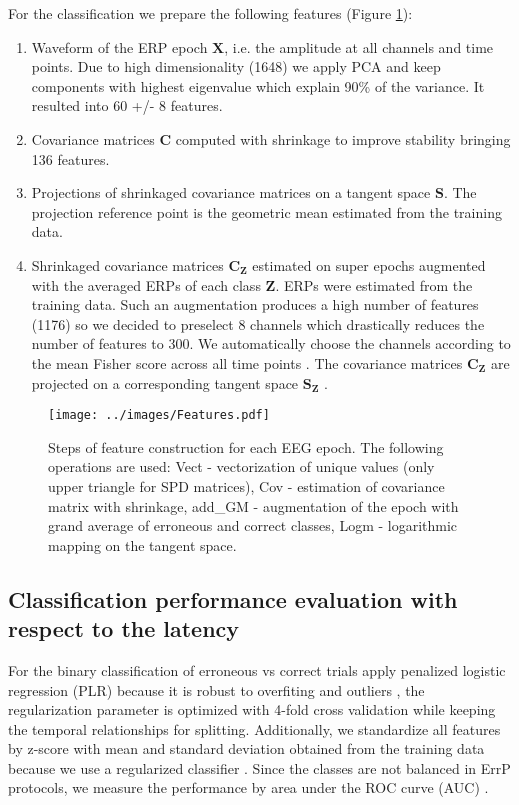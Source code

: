 \documentclass[12pt]{iopart}
\begin{document}
For the classification we prepare the following features (Figure \ref{fig:Features}):
\begin{enumerate}[label=F\arabic*:]
    \item Waveform of the ERP epoch $\mathbf{X}$, i.e. the amplitude at all channels and time points. Due to high
        dimensionality (1648) we apply PCA and keep components with highest eigenvalue
        which explain 90\% of the variance. It resulted into 60 +/- 8 features.
    \item Covariance matrices $\mathbf{C}$ computed with shrinkage to improve stability bringing 136 features.
    \item Projections of shrinkaged covariance matrices on a tangent space $\mathbf{S}$. The projection reference
        point is the geometric mean estimated from the training data.
    \item Shrinkaged covariance matrices $\mathbf{C_Z}$ estimated on super epochs augmented with the averaged ERPs
        of each class $\mathbf{Z}$. ERPs were estimated from the training data.
        Such an augmentation produces
        a high number of features (1176) so we decided to preselect 8 channels which
        drastically reduces the number of features to 300. We automatically choose
        the channels according to the mean Fisher score across all time points \cite{duda_pattern_2001}.
        The covariance matrices $\mathbf{C_Z}$ are projected on a corresponding tangent space $\mathbf{S_Z}$ .
\end{enumerate}


\begin{figure}[!t]
    \texttt{[image: ../images/Features.pdf]}
\caption{Steps of feature construction for each EEG epoch. The following operations are used:
    Vect - vectorization of unique values (only upper triangle for SPD matrices), Cov - estimation of covariance matrix with shrinkage,
add\_GM - augmentation of the epoch with grand average of erroneous and correct classes,
Logm - logarithmic mapping on the tangent space.}
\label{fig:Features}
\end{figure}

\subsection{Classification performance evaluation with respect to the latency}

For the binary classification of erroneous vs correct trials apply penalized logistic
regression (PLR) because it is robust to overfiting and outliers \cite{parra_recipes_2005},
the regularization parameter is optimized with 4-fold cross validation
while keeping the temporal relationships for splitting. 
Additionally, we standardize all features by z-score with mean and standard deviation
obtained from the training data because we use a regularized classifier \cite{hastie_elements_2009}.
Since the classes
are not balanced in ErrP protocols, we measure the performance by area under the ROC curve (AUC) 
\cite{bradley_use_1997}.
\end{document}
